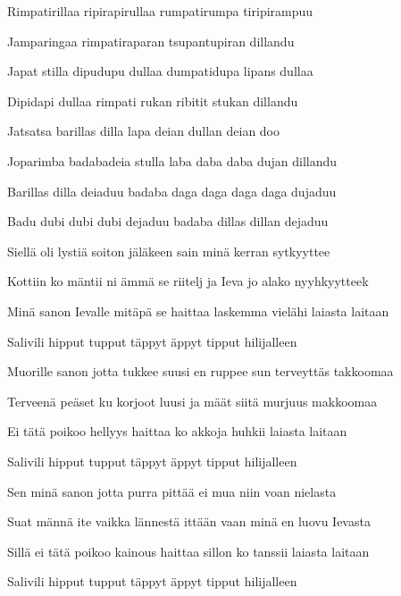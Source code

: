 \begin{song}
\bigskip

Rimpatirillaa ripirapirullaa rumpatirumpa tiripirampuu \par
{}Jamparingaa rimpatiraparan tsupantupiran dillandu \par
{}Japat stilla dipudupu dullaa dumpatidupa lipans dullaa \par
{}Dipidapi dullaa rimpati rukan ribitit stukan dillandu \par

\bigskip

Jatsatsa barillas dilla lapa deian dullan deian doo \par
{}Joparimba badabadeia stulla laba daba daba dujan dillandu \par
{}Barillas dilla deiaduu badaba daga daga daga daga dujaduu \par
{}Badu dubi dubi dubi dejaduu badaba dillas dillan dejaduu \par

\bigskip

Siellä oli lystiä soiton jäläkeen sain minä kerran sytkyyttee \par
{}Kottiin ko mäntii ni ämmä se riitelj ja Ieva jo alako nyyhkyytteek \par
{}Minä sanon Ievalle mitäpä se haittaa laskemma vielähi laiasta laitaan \par
{}Salivili hipput tupput täppyt äppyt tipput hilijalleen \par

\bigskip

Muorille sanon jotta tukkee suusi en ruppee sun terveyttäs takkoomaa \par
{}Terveenä peäset ku korjoot luusi ja määt siitä murjuus makkoomaa \par
{}Ei tätä poikoo hellyys haittaa ko akkoja huhkii laiasta laitaan \par
{}Salivili hipput tupput täppyt äppyt tipput hilijalleen \par

\bigskip

Sen minä sanon jotta purra pittää ei mua niin voan nielasta \par
{}Suat männä ite vaikka lännestä ittään vaan minä en luovu Ievasta \par
{}Sillä ei tätä poikoo kainous haittaa sillon ko tanssii laiasta laitaan \par
{}Salivili hipput tupput täppyt äppyt tipput hilijalleen \par

\end{song}
